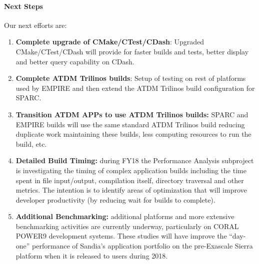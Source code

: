 \paragraph{Next Steps}

Our next efforts are:

\begin{enumerate}

\item \textbf{Complete upgrade of CMake/CTest/CDash}: Upgraded CMake/CTest/CDash will provide for faster builds and tests, better display and better query capability on CDash.

\item \textbf{Complete ATDM Trilinos builds}: Setup of testing on rest of platforms used by EMPIRE and then extend the ATDM Trilinos build configuration for SPARC.

\item \textbf{Transition ATDM APPs to use ATDM Trilinos builds:} SPARC and EMPIRE builds will use the same standard ATDM Trilinos build reducing duplicate work maintaining these builds, less computing resources to run the build, etc.

\item \textbf{Detailed Build Timing:} during FY18 the Performance Analysis subproject is investigating the timing of complex application builds including the time spent in file input/output, compilation itself, directory traversal and other metrics.
The intention is to identify areas of optimization that will improve developer productivity (by reducing wait for builds to complete). 

\item \textbf{Additional Benchmarking:} additional platforms and more extensive benchmarking activities are currently underway, particularly on CORAL POWER9 development systems.
These studies will have improve the ``day-one'' performance of Sandia's application portfolio on the pre-Exascale Sierra platform when it is released to users during 2018.

\end{enumerate}
